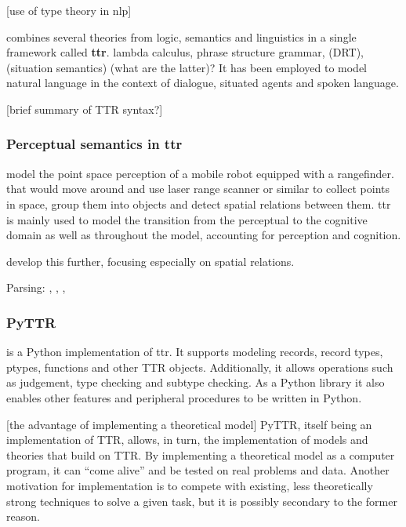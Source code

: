 [use of type theory in nlp]

\cite{CooperRecordsRecordTypes2005} combines several theories from logic, semantics and linguistics in a single framework called \textbf{\acrfull{ttr}}.
 lambda calculus, phrase structure grammar, (DRT), (situation semantics) (what are the latter)?
It has been employed to model natural language in the context of dialogue, situated agents and spoken language.

[brief summary of TTR syntax?]



\subsubsection{Perceptual semantics in \gls{ttr}}

\cite{LarssonDialoguesHaveContent2011}

\cite{DobnikModellinglanguageaction2012}

\cite{lspc} model the point space perception of a mobile robot equipped with a rangefinder.
 that would move around and use laser range scanner or similar to collect points in space, group them into objects and detect spatial relations between them.
\Gls{ttr} is mainly used to model the transition from the perceptual to the cognitive domain as well as 
 throughout the model, accounting for perception and cognition.

\cite{ttrspat} develop this further, focusing especially on spatial relations.

\cite{LarssonFormalsemanticsperceptual2015}

Parsing: \cite{CooperRecordsRecordTypes2005}, \cite{RobinCooperAustiniantruthattitudes2005}, \cite{CooperTypetheorysemantics2012}, \cite{CooperTypetheorylanguage2016}



\subsubsection{PyTTR}

\cite{pyttr} is a Python implementation of \gls{ttr}.
It supports modeling records, record types, ptypes, functions and other TTR objects.
Additionally, it allows operations such as judgement, type checking and subtype checking.
As a Python library it also enables other features and peripheral procedures to be written in Python.

[the advantage of implementing a theoretical model]
PyTTR, itself being an implementation of TTR, allows, in turn, the implementation of models and theories that build on TTR.
By implementing a theoretical model as a computer program, it can ``come alive'' and be tested on real problems and data.
Another motivation for implementation is to compete with existing, less theoretically strong techniques to solve a given task, but it is possibly secondary to the former reason.

